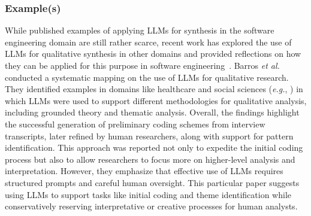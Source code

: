 
\subsubsection{Example(s)} 

While published examples of applying LLMs for synthesis in the software engineering domain are still rather scarce, recent work has explored the use of LLMs for qualitative synthesis in other domains and provided reflections on how they can be applied for this purpose in software engineering~\cite{DBLP:journals/ase/BanoHZT24}. Barros \textit{et al.}~\cite{barros2024largelanguagemodelqualitative} conducted a systematic mapping on the use of LLMs for qualitative research. They identified examples in domains like healthcare and social sciences (\textit{e.g.}, \cite{de2024performing,mathis2024inductive}) in which LLMs were used to support different methodologies for qualitative analysis, including grounded theory and thematic analysis. Overall, the findings highlight the successful generation of preliminary coding schemes from interview transcripts, later refined by human researchers, along with support for pattern identification. This approach was reported not only to expedite the initial coding process but also to allow researchers to focus more on higher-level analysis and interpretation. However, they emphasize that effective use of LLMs requires structured prompts and careful human oversight. This particular paper suggests using LLMs to support tasks like initial coding and theme identification while conservatively reserving interpretative or creative processes for human analysts.

